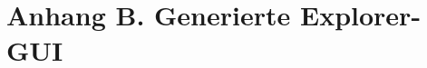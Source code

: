 \chapter{Anhang B. Generierte Explorer-GUI}\label{explorergui}
\renewcommand{\thefigure}{B\arabic{figure}} 
\setcounter{figure}{0}
